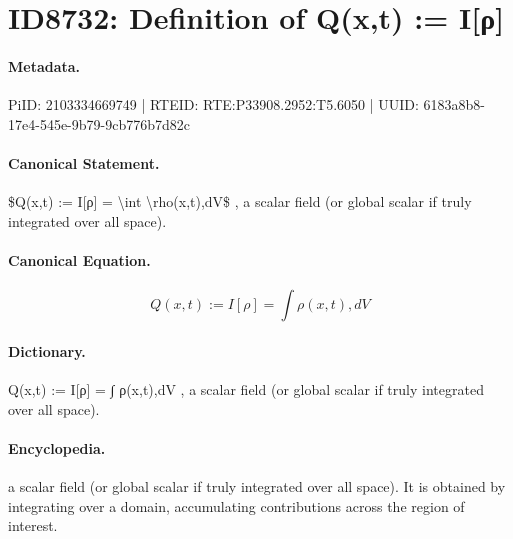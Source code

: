 \section*{ID8732: Definition of Q(x,t) := I[ρ]}
\paragraph{Metadata.}
PiID: 2103334669749 | RTEID: RTE:P33908.2952:T5.6050 | UUID: 6183a8b8-17e4-545e-9b79-9cb776b7d82c

\paragraph{Canonical Statement.}
\$Q(x,t) := I[ρ] = \textbackslash{}int \textbackslash{}rho(x,t),dV\$ , a scalar field (or global scalar if truly integrated over all space).

\paragraph{Canonical Equation.}
\[
Q(x,t) := I[ρ] = \int \rho(x,t),dV
\]

\paragraph{Dictionary.}
Q(x,t) := I[ρ] = ∫ ρ(x,t),dV , a scalar field (or global scalar if truly integrated over all space).

\paragraph{Encyclopedia.}
a scalar field (or global scalar if truly integrated over all space). It is obtained by integrating over a domain, accumulating contributions across the region of interest.

